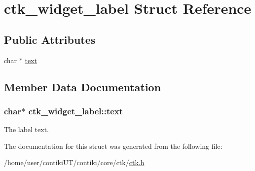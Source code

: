 \hypertarget{structctk__widget__label}{}\section{ctk\+\_\+widget\+\_\+label Struct Reference}
\label{structctk__widget__label}
\subsection*{Public Attributes}
\begin{DoxyCompactItemize}
\item 
char $\ast$ \hyperlink{structctk__widget__label_a6040f1034fa9ace925c69cdc8d0bbc65}{text}
\end{DoxyCompactItemize}


\subsection{Member Data Documentation}
\hypertarget{structctk__widget__label_a6040f1034fa9ace925c69cdc8d0bbc65}{}
\subsubsection[{text}]{\setlength{\rightskip}{0pt plus 5cm}char$\ast$ ctk\+\_\+widget\+\_\+label\+::text}\label{structctk__widget__label_a6040f1034fa9ace925c69cdc8d0bbc65}
The label text. 

The documentation for this struct was generated from the following file\+:\begin{DoxyCompactItemize}
\item 
/home/user/contiki\+U\+T/contiki/core/ctk/\hyperlink{ctk_8h}{ctk.\+h}\end{DoxyCompactItemize}
